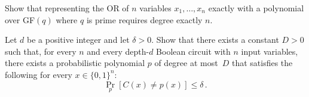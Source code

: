 \documentclass[english]{uebung_cs}
\begin{document}

\begin{exercise}
  Show that representing the OR of $n$ variables $x_1,\dots,x_n$ exactly with a polynomial over GF$(q)$ where $q$ is prime requires degree exactly $n$.
\end{exercise}

\begin{exercise}
  Let $d$ be a positive integer and let $\delta>0$.
  Show that there exists a constant $D>0$ such that, for every $n$ and every depth-$d$ Boolean circuit with $n$ input variables, there exists a probabilistic polynomial $p$ of degree at most~$D$ that satisfies the following for every $x\in\{0,1\}^n$:
  \[
    \Pr_p[C(x)\neq p(x)]\leq\delta\,.
  \]
\end{exercise}
\end{document}

